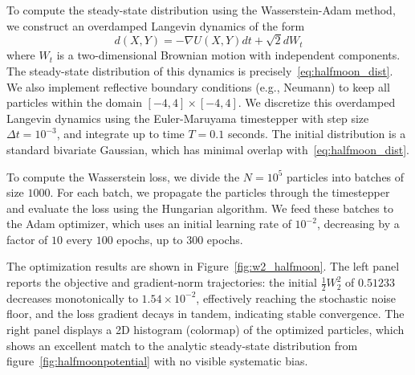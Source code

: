 \documentclass{article}
\begin{document}
To compute the steady-state distribution using the Wasserstein-Adam method, we construct an overdamped Langevin dynamics of the form
\begin{equation} \label{eq:langevin_halfmoon}
    d(X,Y) = -\nabla U(X,Y) dt + \sqrt{2} dW_t
\end{equation}
where $W_t$ is a two-dimensional Brownian motion with independent components. The steady-state distribution of this dynamics is precisely~\eqref{eq:halfmoon_dist}. We also implement reflective boundary conditions (e.g., Neumann) to keep all particles within the domain $[-4,4] \times [-4,4]$. We discretize this overdamped Langevin dynamics using the Euler-Maruyama timestepper with step size $\Delta t = 10^{-3}$, and integrate up to time $T = 0.1$ seconds. The initial distribution is a standard bivariate Gaussian, which has minimal overlap with~\eqref{eq:halfmoon_dist}.

To compute the Wasserstein loss, we divide the $N=10^5$ particles into batches of size $1000$. For each batch, we propagate the particles through the timestepper and evaluate the loss using the Hungarian algorithm. We feed these batches to the Adam optimizer, which uses an initial learning rate of $10^{-2}$, decreasing by a factor of $10$ every $100$ epochs, up to $300$ epochs. 

The optimization results are shown in Figure~\ref{fig:w2_halfmoon}. The left panel reports the objective and gradient-norm trajectories: the initial $\tfrac12 W_2^2$ of $0.51233$ decreases monotonically to $1.54\times10^{-2}$, effectively reaching the stochastic noise floor, and the loss gradient decays in tandem, indicating stable convergence. The right panel displays a 2D histogram (colormap) of the optimized particles, which shows an excellent match to the analytic steady-state distribution from figure~\ref{fig:halfmoonpotential} with no visible systematic bias.
\end{document}
